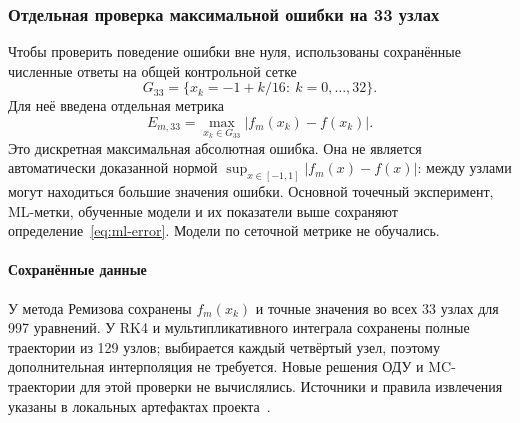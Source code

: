 \documentclass[14pt,a4paper]{extarticle}
\begin{document}
\clearpage
\subsubsection{Отдельная проверка максимальной ошибки на 33 узлах}\label{sec:grid33}
Чтобы проверить поведение ошибки вне нуля, использованы сохранённые
численные ответы на общей контрольной сетке
\[
G_{33}=\{x_k=-1+k/16:\ k=0,\dots,32\}.
\]
Для неё введена отдельная метрика
\begin{equation}\label{eq:grid33-error}
E_{m,33}=\max_{x_k\in G_{33}}|f_m(x_k)-f(x_k)|.
\end{equation}
Это дискретная максимальная абсолютная ошибка. Она не является
автоматически доказанной нормой $\sup_{x\in[-1,1]}|f_m(x)-f(x)|$:
между узлами могут находиться большие значения ошибки.
Основной точечный эксперимент, ML-метки, обученные модели
и их показатели выше сохраняют определение~\eqref{eq:ml-error}.
Модели по сеточной метрике не обучались.

\paragraph{Сохранённые данные\\}
У метода Ремизова сохранены $f_m(x_k)$ и точные значения во всех
33 узлах для 997 уравнений. У RK4 и мультипликативного интеграла
сохранены полные траектории из 129 узлов; выбирается каждый четвёртый
узел, поэтому дополнительная интерполяция не требуется.
Новые решения ОДУ и MC-траектории для этой проверки не вычислялись.
Источники и правила извлечения указаны в локальных артефактах
проекта~\cite{savedgrid}.

\begin{table}[!htbp]
\centering
\caption{Измеренная ошибка $E_{m,33}$ на общих 997 уравнениях.
Для MC полных данных на этой сетке нет.}
\label{tab:grid33-common}
\end{table}
\end{document}
